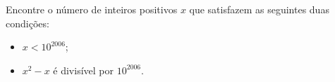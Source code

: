 Encontre o número de inteiros positivos \(x\) que satisfazem as seguintes duas condições:
\begin{itemize}
    \item \(x<10^{2006}\);
    \item \(x^{2}-x\) é divisível por \(10^{2006}\).
\end{itemize}